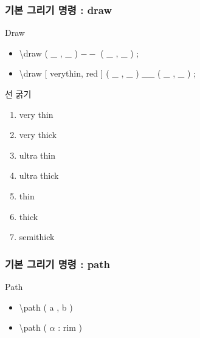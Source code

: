 \documentclass[ aspectratio=169,  10pt,blue,xcolor=pdftex,dvipsnames,table,handout,notes]{beamer}
\begin{document}
		\begin{frame}[t]
		\frametitle{기본 그리기 명령 : draw}

			\begin{block}{Draw}
			\begin{itemize}
			\item[] 	\textbackslash draw ( \_ , \_ ) $--$ ( \_ , \_ ) ;
			\item[] 	\textbackslash draw [ verythin, red ] ( \_ , \_ ) \_\_ ( \_ , \_ ) ;
			\end{itemize}
			\end{block}

		\note[item]{ }

			\begin{block}{선 굵기}
			\begin{enumerate}
			\item 	very thin
			\item 	very thick
			\item 	ultra thin
			\item 	ultra thick
			\item 	thin
			\item 	thick
			\item 	semithick
			\end{enumerate}
			\end{block}


		\end{frame}


		\begin{frame}[t]
		\frametitle{기본 그리기 명령 : path}

			\begin{block}{Path}
			\begin{itemize}
			\item[] 	\textbackslash path ( a , b )
			\item[] 	\textbackslash path ( $\alpha$ : rim )

			\end{itemize}
			\end{block}

		\note[item]{ }

		\end{frame}
\end{document}
